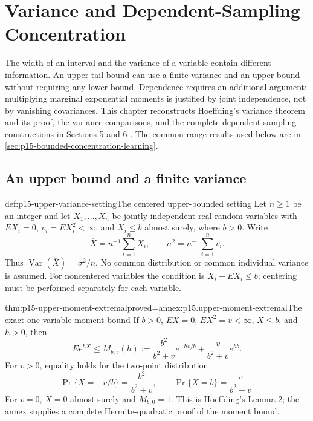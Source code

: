 \chapter{Variance and Dependent-Sampling Concentration}
\label{sec:p15-variance-dependent-concentration}

The width of an interval and the variance of a variable contain different
information. An upper-tail bound can use a finite variance and an upper
bound without requiring any lower bound. Dependence requires an additional
argument: multiplying marginal exponential moments is justified by joint
independence, not by vanishing covariances.
This chapter reconstructs Hoeffding's variance theorem and its proof,
the variance comparisons, and the complete dependent-sampling constructions
in Sections 5 and 6 \cite[Thm.~3, Secs.~3--6]{Hoeffding1963BoundedSums}.
The common-range results used below are in
\cref{sec:p15-bounded-concentration-learning}.

\section{An upper bound and a finite variance}
\label{sec:p15-upper-variance}

\begin{hbdefinition}{def:p15-upper-variance-setting}{The centered upper-bounded setting}
Let \(n\geq1\) be an integer and let \(X_1,\ldots,X_n\) be jointly
independent real random variables with
\(EX_i=0\), \(v_i=EX_i^2<\infty\), and \(X_i\leq b\) almost surely,
where \(b>0\). Write
\[
 \overline X=n^{-1}\sum_{i=1}^nX_i,\qquad
 \sigma^2=n^{-1}\sum_{i=1}^nv_i.
\]
Thus \(\operatorname{Var}(\overline X)=\sigma^2/n\).
No common distribution or common individual variance is assumed.
For noncentered variables the condition is
\(X_i-EX_i\leq b\); centering must be performed separately for each variable.
\end{hbdefinition}

\begin{hblemma}{thm:p15-upper-moment-extremal}{proved=annex:p15.upper-moment-extremal}{The exact one-variable moment bound}
If \(b>0\), \(EX=0\), \(EX^2=v<\infty\), \(X\leq b\), and \(h>0\), then
\[
 Ee^{hX}\leq M_{b,v}(h):=
 \frac{b^2}{b^2+v}e^{-hv/b}+
 \frac{v}{b^2+v}e^{hb}.
\]
For \(v>0\), equality holds for the two-point distribution
\[
 \Pr\{X=-v/b\}=\frac{b^2}{b^2+v},\qquad
 \Pr\{X=b\}=\frac{v}{b^2+v}.
\]
For \(v=0\), \(X=0\) almost surely and \(M_{b,0}=1\).
This is Hoeffding's Lemma 2; the annex supplies a complete
Hermite-quadratic proof of the moment bound.
\end{hblemma}

